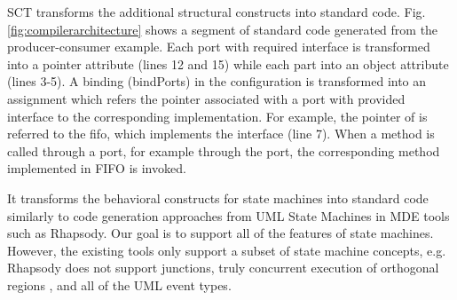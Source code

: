 \noindent
{}
SCT transforms the additional structural constructs into standard code.
Fig. \ref{fig:compilerarchitecture} shows a segment of standard code generated from the producer-consumer example.
Each port with required interface is transformed into a pointer attribute (lines 12 and 15) while each part into an object attribute (lines 3-5).
A binding (bindPorts) in the configuration is transformed into an assignment which refers the pointer associated with a port with provided interface to the corresponding implementation.
For example, the  pointer of  is referred to the fifo, which implements the  interface (line 7). 
When a method is called through a port, for example  through the  port, the corresponding method implemented in FIFO is invoked. 


\noindent
{}
It transforms the behavioral constructs for state machines into standard code similarly to code generation approaches from UML State Machines in MDE tools such as Rhapsody.
Our goal is to support all of the features of state machines.
However, the existing tools only support a subset of state machine concepts, e.g. Rhapsody does not support junctions, truly concurrent execution of orthogonal regions \cite{ibmdiff}, and all of the UML event types.

